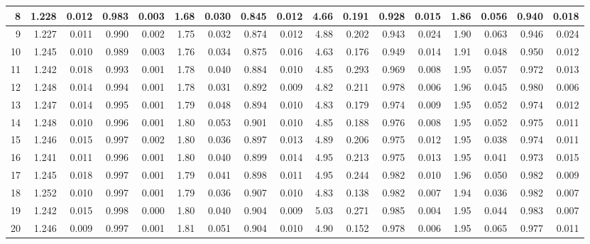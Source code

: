 \documentclass[
]{article}
\begin{document}
\begin{table}[H]
{\begin{tabular}{r|r|r|r|r|r|r|r|r|r|r|r|r|r|r|r|r}
\hline
8 & 1.228 & 0.012 & 0.983 & 0.003 & 1.68 & 0.030 & 0.845 & 0.012 & 4.66 & 0.191 & 0.928 & 0.015 & 1.86 & 0.056 & 0.940 & 0.018\\
\hline
9 & 1.227 & 0.011 & 0.990 & 0.002 & 1.75 & 0.032 & 0.874 & 0.012 & 4.88 & 0.202 & 0.943 & 0.024 & 1.90 & 0.063 & 0.946 & 0.024\\
\hline
10 & 1.245 & 0.010 & 0.989 & 0.003 & 1.76 & 0.034 & 0.875 & 0.016 & 4.63 & 0.176 & 0.949 & 0.014 & 1.91 & 0.048 & 0.950 & 0.012\\
\hline
11 & 1.242 & 0.018 & 0.993 & 0.001 & 1.78 & 0.040 & 0.884 & 0.010 & 4.85 & 0.293 & 0.969 & 0.008 & 1.95 & 0.057 & 0.972 & 0.013\\
\hline
12 & 1.248 & 0.014 & 0.994 & 0.001 & 1.78 & 0.031 & 0.892 & 0.009 & 4.82 & 0.211 & 0.978 & 0.006 & 1.96 & 0.045 & 0.980 & 0.006\\
\hline
13 & 1.247 & 0.014 & 0.995 & 0.001 & 1.79 & 0.048 & 0.894 & 0.010 & 4.83 & 0.179 & 0.974 & 0.009 & 1.95 & 0.052 & 0.974 & 0.012\\
\hline
14 & 1.248 & 0.010 & 0.996 & 0.001 & 1.80 & 0.053 & 0.901 & 0.010 & 4.85 & 0.188 & 0.976 & 0.008 & 1.95 & 0.052 & 0.975 & 0.011\\
\hline
15 & 1.246 & 0.015 & 0.997 & 0.002 & 1.80 & 0.036 & 0.897 & 0.013 & 4.89 & 0.206 & 0.975 & 0.012 & 1.95 & 0.038 & 0.974 & 0.011\\
\hline
16 & 1.241 & 0.011 & 0.996 & 0.001 & 1.80 & 0.040 & 0.899 & 0.014 & 4.95 & 0.213 & 0.975 & 0.013 & 1.95 & 0.041 & 0.973 & 0.015\\
\hline
17 & 1.245 & 0.018 & 0.997 & 0.001 & 1.79 & 0.041 & 0.898 & 0.011 & 4.95 & 0.244 & 0.982 & 0.010 & 1.96 & 0.050 & 0.982 & 0.009\\
\hline
18 & 1.252 & 0.010 & 0.997 & 0.001 & 1.79 & 0.036 & 0.907 & 0.010 & 4.83 & 0.138 & 0.982 & 0.007 & 1.94 & 0.036 & 0.982 & 0.007\\
\hline
19 & 1.242 & 0.015 & 0.998 & 0.000 & 1.80 & 0.040 & 0.904 & 0.009 & 5.03 & 0.271 & 0.985 & 0.004 & 1.95 & 0.044 & 0.983 & 0.007\\
\hline
20 & 1.246 & 0.009 & 0.997 & 0.001 & 1.81 & 0.051 & 0.904 & 0.010 & 4.90 & 0.152 & 0.978 & 0.006 & 1.95 & 0.065 & 0.977 & 0.011\\
\hline
\end{tabular}}\begin{table}
\centering
{}
\end{table}
\end{table}
\end{document}
